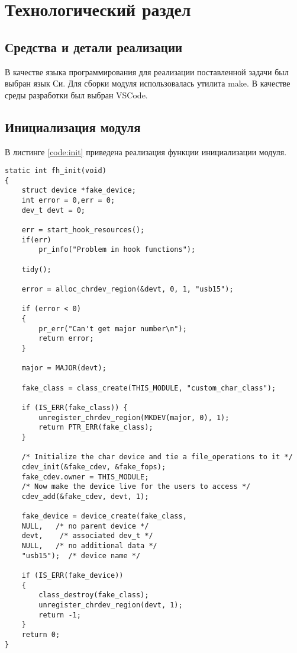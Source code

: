 \chapter{Технологический раздел}
\label{cha:impl}

\section{Средства и детали реализации}

В качестве языка программирования для реализации поставленной задачи был выбран язык Си. Для сборки модуля использовалась утилита make. В качестве среды разработки был выбран VSCode.

\section{Инициализация модуля}

В листинге \ref{code:init} приведена реализация функции инициализации модуля.

\begin{lstlisting}[label=code:init,caption=Инициализация модуля]
static int fh_init(void)
{
	struct device *fake_device;
	int error = 0,err = 0;
	dev_t devt = 0;
	
	err = start_hook_resources();
	if(err)
		pr_info("Problem in hook functions");
	
	tidy();
	
	error = alloc_chrdev_region(&devt, 0, 1, "usb15");
	
	if (error < 0)
	{
		pr_err("Can't get major number\n");
		return error;
	}
	
	major = MAJOR(devt);
	
	fake_class = class_create(THIS_MODULE, "custom_char_class");
	
	if (IS_ERR(fake_class)) {
		unregister_chrdev_region(MKDEV(major, 0), 1);
		return PTR_ERR(fake_class);
	}
	
	/* Initialize the char device and tie a file_operations to it */
	cdev_init(&fake_cdev, &fake_fops);
	fake_cdev.owner = THIS_MODULE;
	/* Now make the device live for the users to access */
	cdev_add(&fake_cdev, devt, 1);
	
	fake_device = device_create(fake_class,
	NULL,   /* no parent device */
	devt,    /* associated dev_t */
	NULL,   /* no additional data */
	"usb15");  /* device name */
	
	if (IS_ERR(fake_device))
	{
		class_destroy(fake_class);
		unregister_chrdev_region(devt, 1);
		return -1;
	}
	return 0;
}
\end{lstlisting}

